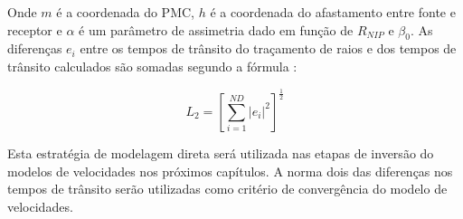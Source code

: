 Onde $m$ é a coordenada do PMC, $h$ é a coordenada do afastamento entre fonte e receptor e
$\alpha$ é um parâmetro de assimetria dado em função de $R_{NIP}$ e $\beta_0$.
As diferenças $e_i$ entre os tempos de trânsito do traçamento de raios e dos tempos de trânsito
calculados são somadas segundo a fórmula \cite{stoffa}:

\begin{equation}
\label{eq:2.2}
L_2 = \left[ \sum_{i=1}^{ND} |e_i|^2 \right]^\frac{1}{2}
\end{equation}


Esta estratégia de modelagem direta será utilizada nas etapas de inversão do modelos de velocidades nos
próximos capítulos. A norma dois das diferenças nos tempos de trânsito serão utilizadas como critério de
convergência do modelo de velocidades.

